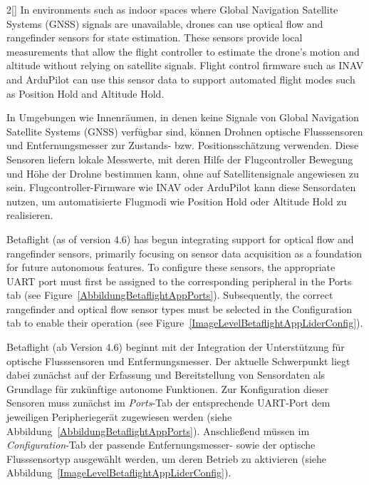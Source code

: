 \begin{paracol}{2}[]
In environments such as indoor spaces where Global Navigation Satellite Systems (GNSS) signals are unavailable, drones can use optical flow and rangefinder sensors for state estimation. These sensors provide local measurements that allow the flight controller to estimate the drone’s motion and altitude without relying on satellite signals. Flight control firmware such as INAV and ArduPilot can use this sensor data to support automated flight modes such as Position Hold and Altitude Hold.

\colger

In Umgebungen wie Innenräumen, in denen keine Signale von Global Navigation Satellite Systems (GNSS) verfügbar sind, können Drohnen optische Flusssensoren und Entfernungsmesser zur Zustands- bzw. Positionsschätzung verwenden. Diese Sensoren liefern lokale Messwerte, mit deren Hilfe der Flugcontroller Bewegung und Höhe der Drohne bestimmen kann, ohne auf Satellitensignale angewiesen zu sein. Flugcontroller-Firmware wie INAV oder ArduPilot kann diese Sensordaten nutzen, um automatisierte Flugmodi wie Position Hold oder Altitude Hold zu realisieren.

\colende

\renewcommand{\deutschertitel}{Optischer Fluss und Entfernungsmesser (Betaflight)}
\renewcommand{\englischertitel}{Optical Flow and LiDAR Sensor Configuration (Betaflight)}
\makrounterabschnitt

Betaflight (as of version 4.6) has begun integrating support for optical flow and rangefinder sensors, primarily focusing on sensor data acquisition as a foundation for future autonomous features. To configure these sensors, the appropriate UART port must first be assigned to the corresponding peripheral in the Ports tab (see Figure~\ref{AbbildungBetaflightAppPorts}). Subsequently, the correct rangefinder and optical flow sensor types must be selected in the Configuration tab to enable their operation (see Figure~\ref{ImageLevelBetaflightAppLiderConfig}).

\colger

Betaflight (ab Version 4.6) beginnt mit der Integration der Unterstützung für optische Flusssensoren und Entfernungsmesser. Der aktuelle Schwerpunkt liegt dabei zunächst auf der Erfassung und Bereitstellung von Sensordaten als Grundlage für zukünftige autonome Funktionen. Zur Konfiguration dieser Sensoren muss zunächst im \textit{Ports}-Tab der entsprechende UART-Port dem jeweiligen Peripheriegerät zugewiesen werden (siehe Abbildung~\ref{AbbildungBetaflightAppPorts}). Anschließend müssen im \textit{Configuration}-Tab der passende Entfernungsmesser- sowie der optische Flusssensortyp ausgewählt werden, um deren Betrieb zu aktivieren (siehe Abbildung~\ref{ImageLevelBetaflightAppLiderConfig}).


\end{paracol}
